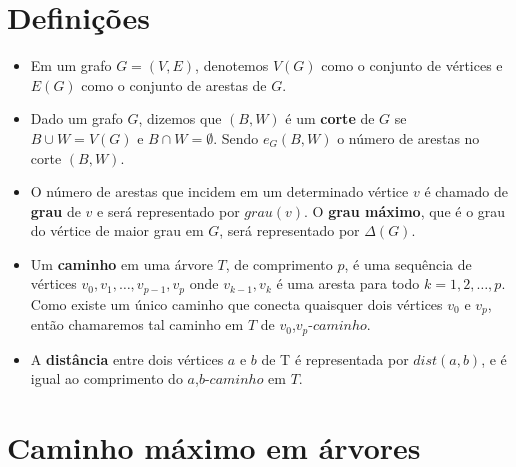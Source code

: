 \documentclass[a4paper,12pt]{article}
\begin{document}
\newpage


\section{Definições}
	\begin{itemize}
		\item Em um grafo $G =(V,E)$, denotemos $V(G)$
		como o conjunto de vértices e 
		$E(G)$ como o conjunto de arestas de $G$.

		\item Dado um grafo $G$, dizemos que $(B,W)$ é um 
		\textbf{corte}
		de $G$ se $B \cup W = V(G)$ e $B \cap W = \emptyset$.
		Sendo $e_G(B,W)$ o número de arestas no corte $(B,W)$.

		\item O número de arestas que incidem em um determinado
		vértice $v$ é chamado de 
		\textbf{grau} de $v$ e será representado
		por $grau(v)$. O 
		\textbf{grau máximo}, que é o grau do vértice de
		maior grau em $G$, será representado por $\Delta(G)$.

		\item Um \textbf{caminho} em uma árvore $T$, de 
    	comprimento $p$, é uma sequência de vértices 
    	$v_0, v_1, \ldots,v_{p-1}, v_p$ 
    	onde {$v_{k-1}, v_k$} é uma aresta para todo 
    	$k = 1,2, \ldots, p$. 
    	Como existe um único caminho que conecta quaisquer dois 
    	vértices $v_0$ e $v_p$, então chamaremos tal caminho em $T$
    	de  
    	$v_0$,$v_p$-$caminho$.

		\item A \textbf{distância} entre dois vértices $a$ e 
		$b$ de T é representada por 
		$dist(a,b)$, e é igual ao comprimento do
		$a$,$b$-$caminho$ em $T$.

		
	\end{itemize}

\newpage



\section{Caminho máximo em árvores}
\end{document}
